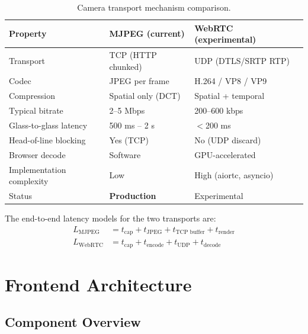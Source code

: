 \documentclass[12pt,a4paper]{article}
\begin{document}
\begin{table}[H]
\centering
\caption{Camera transport mechanism comparison.}
\label{tab:streaming}
\begin{tabular}{@{}llll@{}}
\toprule
\textbf{Property}          & \textbf{MJPEG (current)} & \textbf{WebRTC (experimental)} \\
\midrule
Transport                  & TCP (HTTP chunked)       & UDP (DTLS/SRTP RTP) \\
Codec                      & JPEG per frame           & H.264 / VP8 / VP9 \\
Compression                & Spatial only (DCT)       & Spatial + temporal \\
Typical bitrate            & 2--5 Mbps                & 200--600 kbps \\
Glass-to-glass latency     & 500 ms -- 2 s            & $<$200 ms \\
Head-of-line blocking      & Yes (TCP)                & No (UDP discard) \\
Browser decode             & Software                 & GPU-accelerated \\
Implementation complexity  & Low                      & High (aiortc, asyncio) \\
Status                     & \textbf{Production}      & Experimental \\
\bottomrule
\end{tabular}
\end{table}

The end-to-end latency models for the two transports are:
\begin{align}
L_{\text{MJPEG}}  &= t_{\text{cap}} + t_{\text{JPEG}} + t_{\text{TCP buffer}} + t_{\text{render}} \\
L_{\text{WebRTC}} &= t_{\text{cap}} + t_{\text{encode}} + t_{\text{UDP}} + t_{\text{decode}}
\end{align}

\section{Frontend Architecture}

\subsection{Component Overview}
\end{document}
